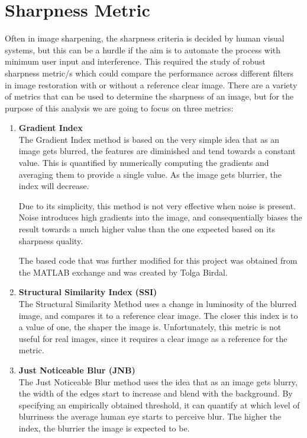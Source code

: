 \graphicspath{{mehul_pics/}}%

\section{Sharpness Metric}
Often in image sharpening, the sharpness criteria is decided by human visual systems, but this can be a hurdle if the aim is to automate the process with minimum user input and interference. This required the study of robust sharpness metric/s which could compare the performance across different filters in image restoration with or without a reference clear image. There are a variety of metrics that can be used to determine the sharpness of an image, but for the purpose of this analysis we are going to focus on three metrics:

\begin{enumerate}
\item {\bf Gradient Index} \\
The Gradient Index method is based on the very simple idea that as an image gets blurred, the features are diminished and tend towards a constant value. This is quantified by numerically computing the gradients and averaging them to provide a single value. As the image gets blurrier, the index will decrease. 

Due to its simplicity, this method is not very effective when noise is present. Noise introduces high gradients into the image, and consequentially biases the result towards a much higher value than the one expected based on its sharpness quality.  

The based code that was further modified for this project was obtained from the MATLAB exchange and was created by Tolga Birdal.

\item {\bf Structural Similarity Index (SSI)~\cite{Wang:2004}} \\
The Structural Similarity Method uses a change in luminosity of the blurred image, and compares it to a reference clear image. The closer this index is to a value of one, the shaper the image is. Unfortunately, this metric is not useful for real images, since it requires a clear image as a reference for the metric.

\item {\bf Just Noticeable Blur (JNB)~\cite{Ferzli:2009}} \\
The Just Noticeable Blur method uses the idea that as an image gets blurry, the width of the edges start to increase and blend with the background. By specifying an empirically obtained threshold, it can quantify at which level of blurriness the average human eye starts to perceive blur. The higher the index, the blurrier the image is expected to be.
\end{enumerate}

